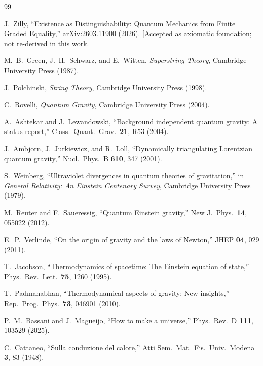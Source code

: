 \documentclass[aps,prd,twocolumn,showpacs,superscriptaddress,preprintnumbers]{revtex4-2}
\begin{document}

\begin{thebibliography}{99}

J.~Zilly, ``Existence as Distinguishability: Quantum Mechanics from Finite Graded Equality,''
arXiv:2603.11900 (2026).
[Accepted as axiomatic foundation; not re-derived in this work.]

M.~B.~Green, J.~H.~Schwarz, and E.~Witten,
\textit{Superstring Theory},
Cambridge University Press (1987).

J.~Polchinski,
\textit{String Theory},
Cambridge University Press (1998).

C.~Rovelli,
\textit{Quantum Gravity},
Cambridge University Press (2004).

A.~Ashtekar and J.~Lewandowski,
``Background independent quantum gravity: A status report,''
Class.\ Quant.\ Grav.\ \textbf{21}, R53 (2004).

J.~Ambjorn, J.~Jurkiewicz, and R.~Loll,
``Dynamically triangulating Lorentzian quantum gravity,''
Nucl.\ Phys.\ B \textbf{610}, 347 (2001).

S.~Weinberg,
``Ultraviolet divergences in quantum theories of gravitation,''
in \textit{General Relativity: An Einstein Centenary Survey},
Cambridge University Press (1979).

M.~Reuter and F.~Saueressig,
``Quantum Einstein gravity,''
New J.\ Phys.\ \textbf{14}, 055022 (2012).

E.~P.~Verlinde,
``On the origin of gravity and the laws of Newton,''
JHEP \textbf{04}, 029 (2011).

T.~Jacobson,
``Thermodynamics of spacetime: The Einstein equation of state,''
Phys.\ Rev.\ Lett.\ \textbf{75}, 1260 (1995).

T.~Padmanabhan,
``Thermodynamical aspects of gravity: New insights,''
Rep.\ Prog.\ Phys.\ \textbf{73}, 046901 (2010).

P.~M.~Bassani and J.~Magueijo,
``How to make a universe,''
Phys.\ Rev.\ D \textbf{111}, 103529 (2025).

C.~Cattaneo,
``Sulla conduzione del calore,''
Atti Sem.\ Mat.\ Fis.\ Univ.\ Modena \textbf{3}, 83 (1948).


\end{thebibliography}
\end{document}
